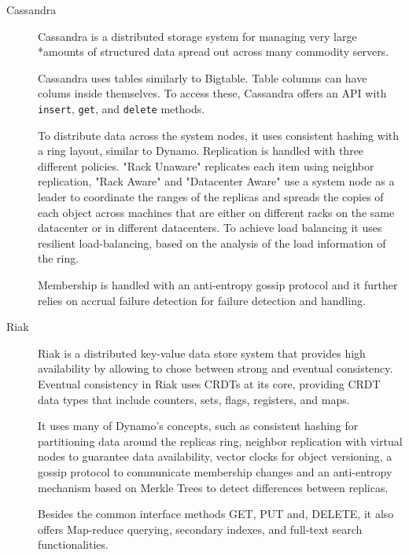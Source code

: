 \begin{description}
\item[Cassandra]\cite{cassandra} Cassandra is a distributed storage system for managing very large \\*amounts of structured data spread out across many commodity servers.\par
	Cassandra uses tables similarly to Bigtable. Table columns can have colums inside themselves. To access these, Cassandra offers an API with \verb|insert|, \verb|get|, and \verb|delete| methods.\par
	To distribute data across the system nodes, it uses consistent hashing with a ring layout, similar to Dynamo. Replication is handled with three different policies. "Rack Unaware" replicates each item using neighbor replication, "Rack Aware" and "Datacenter Aware" use a system node as a leader to coordinate the ranges of the replicas and spreads the copies of each object across machines that are either on different racks on the same datacenter or in different datacenters. To achieve load balancing it uses resilient load-balancing, based on the analysis of the load information of the ring.\par
	Membership is handled with an anti-entropy gossip protocol and it further relies on accrual failure detection for failure detection and handling.
	
\item[Riak]\cite{riak_core} Riak is a distributed key-value data store system that provides high availability by allowing to chose between strong and eventual consistency. Eventual consistency in Riak uses CRDTs at its core, providing CRDT data types that include counters, sets, flags, registers, and maps.\par
	It uses many of Dynamo's concepts, such as consistent hashing for partitioning data around the replicas ring, neighbor replication with virtual nodes to guarantee data availability, vector clocks for object versioning, a gossip protocol to communicate membership changes and an anti-entropy mechanism based on Merkle Trees to detect differences between replicas.\par
	Besides the common interface methods GET, PUT and, DELETE, it also offers Map-reduce querying, secondary indexes, and full-text search functionalities.
	

\end{description}
